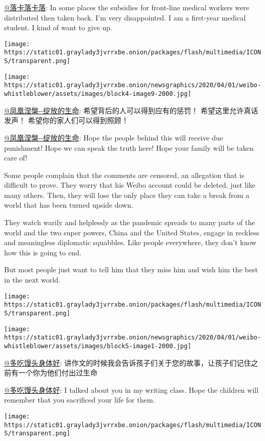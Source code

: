 \href{https://www.weibo.com/u/3560720554}{@落卡落卡落}: In some places
the subsidies for front-line medical workers were distributed then taken
back. I'm very disappointed. I am a first-year medical student. I kind
of want to give up.

\texttt{[image: https://static01.graylady3jvrrxbe.onion/packages/flash/multimedia/ICONS/transparent.png]}

\texttt{[image: https://static01.graylady3jvrrxbe.onion/newsgraphics/2020/04/01/weibo-whistleblower/assets/images/block4-image9-2000.jpg]}

\href{https://www.weibo.com/u/5828497731?is_hot=1}{@凤凰涅槃-\/-绽放的生命}:
希望背后的人可以得到应有的惩罚！ 希望这里允许真话发声！
希望你的家人们可以得到照顾！

\href{https://www.weibo.com/u/5828497731?is_hot=1}{@凤凰涅槃-\/-绽放的生命}:
Hope the people behind this will receive due punishment! Hope we can
speak the truth here! Hope your family will be taken care of!

Some people complain that the comments are censored, an allegation that
is difficult to prove. They worry that his Weibo account could be
deleted, just like many others. Then, they will lose the only place they
can take a break from a world that has been turned upside down.

They watch warily and helplessly as the pandemic spreads to many parts
of the world and the two super powers, China and the United States,
engage in reckless and meaningless diplomatic squabbles. Like people
everywhere, they don't know how this is going to end.

But most people just want to tell him that they miss him and wish him
the best in the next world.

\texttt{[image: https://static01.graylady3jvrrxbe.onion/packages/flash/multimedia/ICONS/transparent.png]}

\texttt{[image: https://static01.graylady3jvrrxbe.onion/newsgraphics/2020/04/01/weibo-whistleblower/assets/images/block5-image1-2000.jpg]}

\href{https://www.weibo.com/u/1910097327}{@多吃馒头身体好}:
讲作文的时候我会告诉孩子们关于您的故事，让孩子们记住之前有一个你为他们付出过生命

\href{https://www.weibo.com/u/1910097327}{@多吃馒头身体好}: I talked
about you in my writing class. Hope the children will remember that you
sacrificed your life for them.

\texttt{[image: https://static01.graylady3jvrrxbe.onion/packages/flash/multimedia/ICONS/transparent.png]}

